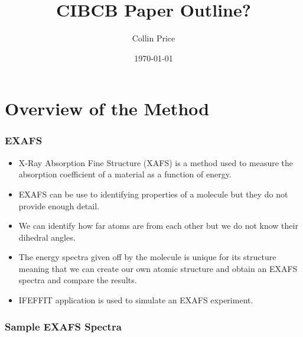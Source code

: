 \documentclass[]{beamer}
\title{CIBCB Paper Outline?}    %
\author{Collin Price}                 %
\institute{Brock University}      %
\date{\today}                    %
\begin{document}
\begin{frame}
  \titlepage
\end{frame}




\section{Overview of the Method}

\begin{frame}
  \frametitle{EXAFS}

  \begin{itemize}
    \item X-Ray Absorption Fine Structure (XAFS) is a method used to measure the absorption coefficient of a material as a function of energy.
    \item EXAFS can be use to identifying properties of a molecule but they do not provide enough detail.
    \item We can identify how far atoms are from each other but we do not know their dihedral angles.
    \item The energy spectra given off by the molecule is unique for its structure meaning that we can create our own atomic structure and obtain an EXAFS spectra and compare the results.
    \item IFEFFIT application is used to simulate an EXAFS experiment.
  \end{itemize}
\end{frame}

\begin{frame}
  \frametitle{Sample EXAFS Spectra}

  \begin{figure}
  \begin{center}
  \end{center}
  \end{figure}

\end{frame}
\end{document}
